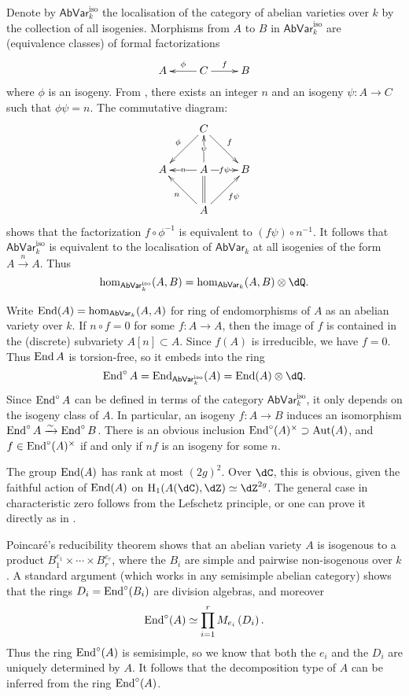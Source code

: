 \documentclass{article}
\begin{document}
Denote by $\mathsf{AbVar}_k^\mathrm{iso}$ the localisation of the category of 
abelian varieties over $k$ by the collection of all isogenies. Morphisms from 
$A$ to $B$ in $\mathsf{AbVar}_k^\mathrm{iso}$ are (equivalence classes) of 
formal factorizations 
\[\xymatrix{
  A 
    & C \ar[l]_-\phi \ar[r]^-f 
    & B
}\]
where $\phi$ is an isogeny. From \cite[V.18]{mu08}, there exists an integer $n$ 
and an isogeny $\psi:A\to C$ such that $\phi\psi=n$. The commutative diagram:
\[\xymatrix{
  & C \ar[dl]_-\phi \ar[dr]^-f \\
  A & A \ar[l]|-n \ar[u]|-\psi \ar[r]|-{f\psi} \ar@{=}[d] & B \\
  & A \ar[ul]^-n \ar[ur]_-{f\psi}
}\]
shows that the factorization $f\circ \phi^{-1}$ is equivalent to 
$(f\psi)\circ n^{-1}$. It follows that $\mathsf{AbVar}_k^\mathrm{iso}$ is 
equivalent to the localisation of $\mathsf{AbVar}_k$ at all isogenies of the 
form $A\xrightarrow n A$. Thus 
\[
  \hom_{\mathsf{AbVar}_k^\mathrm{iso}}(A,B) = \hom_{\mathsf{AbVar}_k}(A,B)\otimes\dQ \text{.}
\]

Write $\operatorname{End}(A)=\hom_{\mathsf{AbVar}_k}(A,A)$ for ring of endomorphisms of $A$ 
as an abelian variety over $k$. If $n\circ f=0$ for some $f:A\to A$, then the 
image of $f$ is contained in the (discrete) subvariety $A[n]\subset A$. Since 
$f(A)$ is irreducible, we have $f=0$. Thus $\operatorname{End} A$ is torsion-free, so it 
embeds into the ring
\[
  \End^\circ A = \End_{\mathsf{AbVar}_k^\mathrm{iso}}(A) = \End(A)\otimes\dQ \text{.}
\]
Since $\operatorname{End}^\circ A$ can be defined in terms of the category 
$\mathsf{AbVar}_{k}^\mathrm{iso}$, it only depends on the isogeny class of 
$A$. In particular, an isogeny $f:A\to B$ induces an isomorphism 
$\operatorname{End}^\circ A\xrightarrow\sim \operatorname{End}^\circ B$. 
There is an obvious inclusion $\operatorname{End}^\circ(A)^\times\supset\operatorname{Aut}(A)$, and  
$f\in \operatorname{End}^\circ(A)^\times$ if and only if $n f$ is an isogeny for some $n$.

The group $\operatorname{End}(A)$ has rank at most $(2 g)^2$. Over $\dC$, this is obvious, 
given the faithful action of $\operatorname{End}(A)$ on $\h_1(A(\dC),\dZ)\simeq \dZ^{2g}$. 
The general case in characteristic zero follows from the Lefschetz principle, 
or one can prove it directly as in \cite[IV.18.3]{mu08}. 

Poincar\'e's reducibility theorem shows that an abelian variety $A$ is 
isogenous to a product $B_1^{e_1}\times \cdots \times B_r^{e_r}$, where the 
$B_i$ are simple and pairwise non-isogenous over $k$. A standard argument 
(which works in any semisimple abelian category) shows that the rings 
$D_i=\operatorname{End}^\circ(B_i)$ are division algebras, and moreover 
\[
  \operatorname{End}^\circ(A) \simeq \prod_{i=1}^r M_{e_i}\left(D_i\right) \text{.}
\]
Thus the ring $\operatorname{End}^\circ(A)$ is semisimple, so we know that both the $e_i$ and 
the $D_i$ are uniquely determined by $A$. It follows that the decomposition 
type of $A$ can be inferred from the ring $\operatorname{End}^\circ(A)$. 
\end{document}
